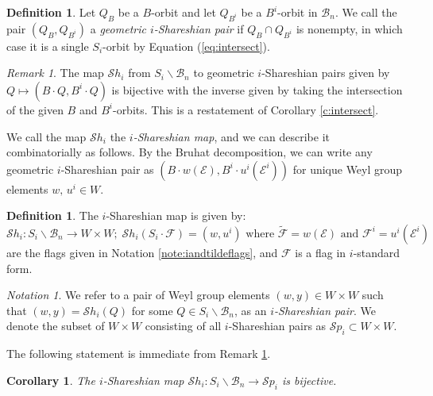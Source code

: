 \documentclass[12pt]{amsart}
\numberwithin{equation}{section}
\newtheorem{cor}[thm]{Corollary}
\theoremstyle{remark}
\newtheorem{rem}[thm]{Remark}
\newtheorem{nota}[thm]{Notation}
\theoremstyle{definition}
\newtheorem{dfn}[thm]{Definition}
\newcommand{\B}{\mathcal{B}}
\newcommand{\F}{\mathcal{F}}
\newcommand{\Sh}{\mathcal{S}h}
\newcommand{\Sp}{\mathcal{S}p}
\begin{document}
\begin{dfn}\label{d:geoShpair}
Let $Q_B$ be a $B$-orbit and let $Q_{B^i}$ be a $B^{i}$-orbit in $\B_n$.  We call the pair $(Q_B,Q_{B^{i}})$ a {\it geometric $i$-Shareshian pair} if $Q_B \cap Q_{B^{i}}$ is nonempty, in which case it is a single $S_{i}$-orbit by Equation (\ref{eq:intersect}).
\end{dfn}

\begin{rem}\label{r:geoshar}
The map $\Sh_{i}$ from $S_{i}\backslash \B_n$ to geometric $i$-Shareshian pairs given by $Q\mapsto (B\cdot Q, B^{i}\cdot Q)$ is bijective with the inverse given by taking the intersection of the given $B$ and $B^{i}$-orbits.  This is a restatement of Corollary \ref{c:intersect}.
\end{rem}

We call the map $\Sh_{i}$ the {\it $i$-Shareshian map}, and we can describe it combinatorially as follows.   By the Bruhat decomposition, we can write any geometric $i$-Shareshian pair as $(B\cdot w(\mathcal{E}),B^{i}\cdot u^{i}(\mathcal{E}^{i}))$ for unique Weyl group elements $w,\, u^{i}\in W$.%
\begin{dfn}\label{d:SHmap}
The $i$-Shareshian map is given by:
\begin{equation}\label{eq:Shmap}
\Sh_{i}: S_{i}\backslash\B_{n}\to W\times W; \;\Sh_{i}(S_{i}\cdot\F)=(w,u^{i}) \mbox{ where } \tilde{\F}=w(\mathcal{E})
\mbox{ and }\F^{i}=u^{i}(\mathcal{E}^{i})
\end{equation}
are the flags given in Notation \ref{note:iandtildeflags}, and $\F$ is a flag in $i$-standard form.
\end{dfn}

\begin{nota}\label{d:Shpair}
 We refer to a pair of Weyl group 
elements $(w,y)\in W\times W$ such that $(w,y)=\Sh_{i}(Q)$ for some $Q\in S_{i}\backslash\B_{n}$,  as an \emph{$i$-Shareshian pair}.  We denote the subset of $W\times W$ consisting of all $i$-Shareshian pairs as $\Sp_{i}\subset W\times W$.  
\end{nota}
\noindent The following statement is immediate from Remark \ref{r:geoshar}.
\begin{cor}\label{c:Shpair}
The $i$-Shareshian map $\Sh_{i}:S_{i}\backslash \B_n \to \Sp_{i}$ is bijective.
\end{cor}
\end{document}
